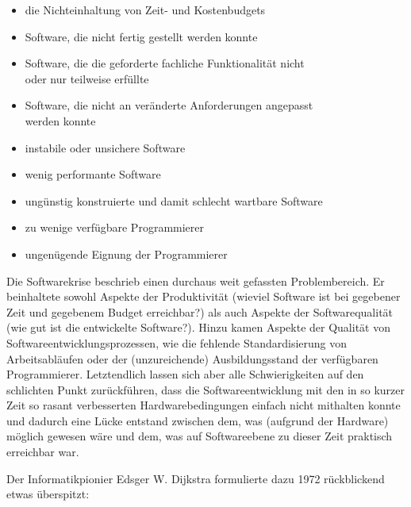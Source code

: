 \begin{itemize}
	\item die Nichteinhaltung von Zeit- und Kostenbudgets
	\item Software, die nicht fertig gestellt werden konnte
	\item Software, die die geforderte fachliche Funktionalität nicht \\
	oder nur teilweise erfüllte
	\item Software, die nicht an veränderte Anforderungen angepasst \\
	werden konnte
	\item instabile oder unsichere Software
	\item wenig performante Software
	\item ungünstig konstruierte und damit schlecht wartbare Software
	\item zu wenige verfügbare Programmierer
	\item ungenügende Eignung der Programmierer
\end{itemize}

\vspace{\baselineskip} %

Die Softwarekrise beschrieb einen durchaus weit gefassten Problembereich. Er be\-inhal\-tete sowohl Aspekte der Produktivität (wieviel Software ist bei gegebener Zeit und gegebenem Budget erreichbar?) als auch Aspekte der Softwarequalität (wie gut ist die entwickelte Software?). Hinzu kamen Aspekte der Qualität von Software\-entwicklungsprozessen, wie die fehlende Standardisierung von Arbeitsabläufen oder der (unzureichende) Ausbildungsstand der verfügbaren Programmierer. Letztendlich lassen sich aber alle Schwierigkeiten auf den schlichten Punkt zurückführen, dass die Softwareentwicklung mit den in so kurzer Zeit so rasant verbesserten Hardware\-bedingungen einfach nicht mithalten konnte und dadurch eine Lücke entstand zwischen dem, was (aufgrund der Hardware) möglich gewesen wäre und dem, was auf Softwareebene zu dieser Zeit praktisch erreichbar war. 

\pagebreak %

Der Informatikpionier Edsger W. Dijkstra formulierte dazu 1972 rückblickend etwas überspitzt:


